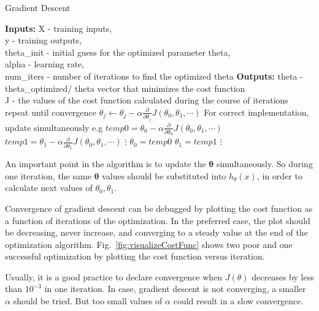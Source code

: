  \begin{algorithm}
   \caption{Gradient Descent}
    \begin{algorithmic}[1]
           \State \textbf{Inputs:} X - training inputs, \\
           \qquad \qquad y - training outputs, \\
           \qquad \qquad theta\_init - initial guess for the optimized parameter theta,\\ 
           \qquad \qquad alpha - learning rate, \\
           \qquad \qquad num\_iters - number of iterations to find the optimized theta
           \State \textbf{Outputs:} theta - theta\_optimized/ theta vector that minimizes the cost function \\
           \qquad \qquad J - the values of the cost function calculated during the course of iterations
    \State repeat until convergence {
    \State $\theta_j \leftarrow \theta_j - \alpha \frac{\partial}{\partial \theta_j}J(\theta_0, \theta_1, \cdots)$
    	 \State For correct implementation, update simultaneously e.g
	 \State 	\qquad  $temp0 = \theta_0 - \alpha \frac{\partial}{\partial \theta_0}J(\theta_0, \theta_1, \cdots)$
	 \State 	\qquad  $temp1 = \theta_1 - \alpha \frac{\partial}{\partial \theta_1}J(\theta_0, \theta_1, \cdots)$
          \State 	\qquad  \qquad $\vdots$
          \State 	\qquad  $\theta_0 = temp0$
	 \State 	\qquad  $\theta_1 = temp1$
	 \State 	\qquad  \qquad $\vdots$
		 }
       \EndFunction
\end{algorithmic}
\end{algorithm}

An important point in the algorithm is to update the $\bm{\theta}$ simultaneously. 
So during one iteration, the same $\bm{\theta}$ values should be substituted into $h_\theta(x)$, in order to calculate next values of $\theta_0, \theta_1$.
 
Convergence of gradient descent can be debugged by plotting the cost function as a function of iterations of the optimization.
In the preferred case, the plot should be decreasing, never increase, and converging to a steady value at the end of the optimization algorithm. 
Fig.~\ref{fig:visualizeCostFunc} shows two poor and one successful optimization by plotting the cost function versus iteration. 

Usually, it is a good practice to declare convergence when $J(\theta)$ decreases by less than $10^{-3}$ in one iteration. 
In case, gradient descent is not converging, a smaller $\alpha$ should be tried. 
But too small values of $\alpha$ could result in a slow convergence. 


